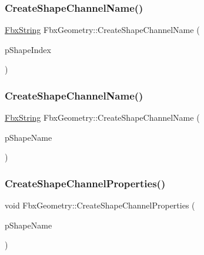 \subsubsection{\texorpdfstring{Create\+Shape\+Channel\+Name()}{CreateShapeChannelName()}\hspace{0.1cm}{\footnotesize\ttfamily [1/2]}}
{\footnotesize\ttfamily \hyperlink{class_fbx_string}{Fbx\+String} Fbx\+Geometry\+::\+Create\+Shape\+Channel\+Name (\begin{DoxyParamCaption}\item[{int}]{p\+Shape\+Index }\end{DoxyParamCaption})\hspace{0.3cm}{\ttfamily [protected]}}

\mbox{\label{class_fbx_geometry_a0f8e33ca5bf929614ffba6893079c136}} 
\subsubsection{\texorpdfstring{Create\+Shape\+Channel\+Name()}{CreateShapeChannelName()}\hspace{0.1cm}{\footnotesize\ttfamily [2/2]}}
{\footnotesize\ttfamily \hyperlink{class_fbx_string}{Fbx\+String} Fbx\+Geometry\+::\+Create\+Shape\+Channel\+Name (\begin{DoxyParamCaption}\item[{\hyperlink{class_fbx_string}{Fbx\+String}}]{p\+Shape\+Name }\end{DoxyParamCaption})\hspace{0.3cm}{\ttfamily [protected]}}

\mbox{\label{class_fbx_geometry_ac9c89d3dfee003accd6092682664501b}} 
\subsubsection{\texorpdfstring{Create\+Shape\+Channel\+Properties()}{CreateShapeChannelProperties()}}
{\footnotesize\ttfamily void Fbx\+Geometry\+::\+Create\+Shape\+Channel\+Properties (\begin{DoxyParamCaption}\item[{\hyperlink{class_fbx_string}{Fbx\+String} \&}]{p\+Shape\+Name }\end{DoxyParamCaption})}

